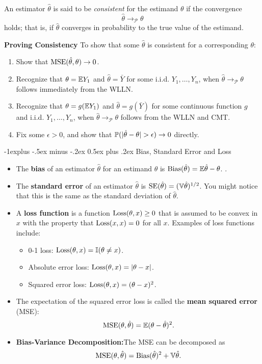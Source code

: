 \documentclass[10pt,landscape]{article}
\makeatletter
\renewcommand{\subsection}{\@startsection{subsection}{2}{0mm}%
                                {-1explus -.5ex minus -.2ex}%
                                {0.5ex plus .2ex}%
                                {\normalfont\normalsize\bfseries}}
\makeatother
\begin{document}
\begin{multicols*}{3}
An estimator $\hat{\theta}$ is said to be \emph{consistent} for the estimand $\theta$ if the convergence $$\hat{\theta}\to_\mathcal{P}\theta$$ holds; that is, if $\hat{\theta}$ converges in probability to the true value of the estimand.

\textbf{Proving Consistency}
 To show that some $\hat{\theta}$ is consistent for a corresponding $\theta$: 
\begin{enumerate}
    \item Show that $\operatorname{MSE}(\hat{\theta},\theta)\to 0$.
    \item Recognize that $\theta=\mathbb{E} Y_1$ and $\hat{\theta}=\bar{Y}$ for some i.i.d. $Y_1,\dots,Y_n$, when $\hat{\theta}\to_\mathcal{P}\theta$ follows immediately from the WLLN.
    \item Recognize that $\theta=g(\mathbb{E} Y_1)$ and $\hat{\theta}=g(\bar{Y})$ for some continuous function $g$ and i.i.d. $Y_1,\dots,Y_n$, when $\hat{\theta}\to_\mathcal{P}\theta$ follows from the WLLN and CMT.
    \item Fix some $\epsilon>0$, and show that $\PP(|\hat{\theta}-\theta|>\epsilon)\to 0$ directly.
\end{enumerate}

\subsection{Bias, Standard Error and Loss}
\begin{itemize}
    \item The \textbf{bias} of an estimator $\hat{\theta}$ for an estimand $\theta$ is $\operatorname{Bias}(\hat{\theta})=\mathbb{E} \hat{\theta}-\theta$. .
    \item The \textbf{standard error} of an estimator $\hat{\theta}$ is $\operatorname{SE}(\hat{\theta})=(\mathbb{V} \hat{\theta})^{1/2}$. You might notice that this is the same as the standard deviation of $\hat{\theta}$.
    \item A \textbf{loss function} is a function $\operatorname{Loss}(\theta,x)\geq 0$ that is assumed to be convex in $x$ with the property that $\operatorname{Loss}(x,x)=0$ for all $x$. Examples of loss functions include:
    \begin{itemize}
        \item 0-1 loss: $\operatorname{Loss}(\theta,x)=\mathbb{I} (\theta\neq x)$.
        \item Absolute error loss: $\operatorname{Loss}(\theta,x)=|\theta-x|$.
        \item Squared error loss: $\operatorname{Loss}(\theta,x)=(\theta-x)^2$.
    \end{itemize}
    \item The expectation of the squared error loss is called the \textbf{mean squared error} (MSE): $$\operatorname{MSE}(\theta,\hat{\theta})=\mathbb{E} (\theta-\hat{\theta})^2.$$
    \item \textbf{Bias-Variance Decomposition:}The MSE can be decomposed as $$\operatorname{MSE}(\theta,\hat{\theta})=\operatorname{Bias}(\hat{\theta})^2+\mathbb{V} \hat{\theta}.$$
\end{itemize}


\end{multicols*}
\end{document}
